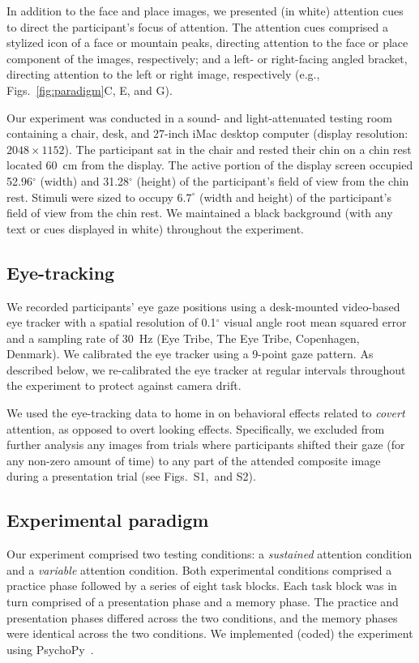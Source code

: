 \documentclass[english]{article}
\newcommand{\gazeLocations}{S1}
\newcommand{\excludedTrials}{S2}
\begin{document}
In addition to the face and place images, we presented (in white) attention
cues to direct the participant's focus of attention. The attention cues
comprised a stylized icon of a face or mountain peaks, directing attention to
the face or place component of the images, respectively; and a left- or
right-facing angled bracket, directing attention to the left or right image,
respectively (e.g., Figs.~\ref{fig:paradigm}C, E, and G).

 Our experiment was conducted in a sound- and light-attenuated testing room
 containing a chair, desk, and 27-inch iMac desktop computer (display
 resolution: $2048 \times 1152$). The participant sat in the chair and rested
 their chin on a chin rest located 60~cm from the display. The active portion
 of the display screen occupied 52.96$^\circ$ (width) and 31.28$^\circ$
 (height) of the participant's field of view from the chin rest. Stimuli were
 sized to occupy $6.7^\circ$ (width and height) of the participant's field of
 view from the chin rest. We maintained a black background (with any text or
 cues displayed in white) throughout the experiment.

\subsection*{Eye-tracking}

We recorded participants' eye gaze positions using a desk-mounted video-based
eye tracker with a spatial resolution of 0.1$^\circ$ visual angle root mean
squared error and a sampling rate of 30~Hz (Eye Tribe, The Eye Tribe,
Copenhagen, Denmark). We calibrated the eye tracker using a 9-point gaze
pattern. As described below, we re-calibrated the eye tracker at regular
intervals throughout the experiment to protect against camera drift.

We used the eye-tracking data to home in on behavioral effects related to
\textit{covert} attention, as opposed to overt looking effects. Specifically,
we excluded from further analysis any images from trials where participants
shifted their gaze (for any non-zero amount of time) to any part of the
attended composite image during a presentation trial (see
Figs.~\gazeLocations,~and \excludedTrials).

\subsection*{Experimental paradigm}

Our experiment comprised two testing conditions: a \textit{sustained} attention
condition and a \textit{variable} attention condition. Both experimental
conditions comprised a practice phase followed by a series of eight task
blocks. Each task block was in turn comprised of a presentation phase and a
memory phase. The practice and presentation phases differed across the two
conditions, and the memory phases were identical across the two conditions.
We implemented (coded) the experiment using PsychoPy~\citep{PeirEtal19}.
\end{document}
